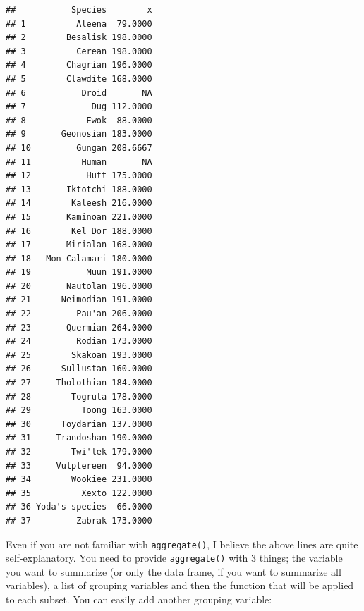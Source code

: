 \documentclass[]{gitbook}
\newenvironment{Shaded}{\begin{snugshade}}{\end{snugshade}}
\newcommand{\DataTypeTok}[1]{\textcolor[rgb]{0.13,0.29,0.53}{#1}}
\newcommand{\KeywordTok}[1]{\textcolor[rgb]{0.13,0.29,0.53}{\textbf{#1}}}
\newcommand{\NormalTok}[1]{#1}
\newcommand{\OperatorTok}[1]{\textcolor[rgb]{0.81,0.36,0.00}{\textbf{#1}}}
\theoremstyle{definition}
\theoremstyle{definition}
\theoremstyle{definition}
\theoremstyle{remark}
\begin{document}
\begin{Shaded}
\end{Shaded}

\begin{verbatim}
##           Species        x
## 1          Aleena  79.0000
## 2        Besalisk 198.0000
## 3          Cerean 198.0000
## 4        Chagrian 196.0000
## 5        Clawdite 168.0000
## 6           Droid       NA
## 7             Dug 112.0000
## 8            Ewok  88.0000
## 9       Geonosian 183.0000
## 10         Gungan 208.6667
## 11          Human       NA
## 12           Hutt 175.0000
## 13       Iktotchi 188.0000
## 14        Kaleesh 216.0000
## 15       Kaminoan 221.0000
## 16        Kel Dor 188.0000
## 17       Mirialan 168.0000
## 18   Mon Calamari 180.0000
## 19           Muun 191.0000
## 20       Nautolan 196.0000
## 21      Neimodian 191.0000
## 22         Pau'an 206.0000
## 23       Quermian 264.0000
## 24         Rodian 173.0000
## 25        Skakoan 193.0000
## 26      Sullustan 160.0000
## 27     Tholothian 184.0000
## 28        Togruta 178.0000
## 29          Toong 163.0000
## 30      Toydarian 137.0000
## 31     Trandoshan 190.0000
## 32        Twi'lek 179.0000
## 33     Vulptereen  94.0000
## 34        Wookiee 231.0000
## 35          Xexto 122.0000
## 36 Yoda's species  66.0000
## 37         Zabrak 173.0000
\end{verbatim}

Even if you are not familiar with \texttt{aggregate()}, I believe the
above lines are quite self-explanatory. You need to provide
\texttt{aggregate()} with 3 things; the variable you want to summarize
(or only the data frame, if you want to summarize all variables), a list
of grouping variables and then the function that will be applied to each
subset. You can easily add another grouping variable:

\begin{Shaded}
\end{Shaded}
\end{document}
